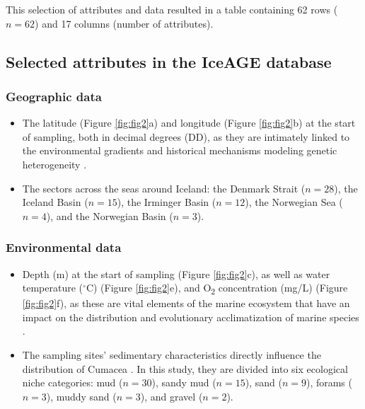 This selection of attributes and data resulted in a table containing 62 rows ($n=62$) and 17 columns (number of attributes). 

\subsection{Selected attributes in the IceAGE database}

\subsubsection{Geographic data} 

\begin{itemize}
\item The latitude (Figure \ref{fig:fig2}a) and longitude (Figure \ref{fig:fig2}b) at the start of sampling, both in decimal degrees (DD), as they are intimately linked to the environmental gradients and historical mechanisms modeling genetic heterogeneity \citep{gaither2013origins}.
\item The sectors across the seas around Iceland: the Denmark Strait ($n=28$), the Iceland Basin ($n=15$), the Irminger Basin ($n=12$), the Norwegian Sea ($n=4$), and the Norwegian Basin ($n=3$). 
\end{itemize}

\subsubsection{Environmental data} 
\begin{itemize}
\item Depth (m) at the start of sampling (Figure \ref{fig:fig2}c), as well as water temperature ($^\circ$C) (Figure \ref{fig:fig2}e), and O\textsubscript{2} concentration (mg/L) (Figure \ref{fig:fig2}f), as these are vital elements of the marine ecosystem that have an impact on the distribution and evolutionary acclimatization of marine species \citep{rex2006global, danovaro2010first}. 
\item The sampling sites' sedimentary characteristics directly influence the distribution of Cumacea \citep{uhlir_adding_2021}. In this study, they are divided into six ecological niche categories: mud ($n=30$), sandy mud ($n=15$), sand ($n=9$), forams ($n=3$), muddy sand ($n=3$), and gravel ($n=2$).
\end{itemize}

